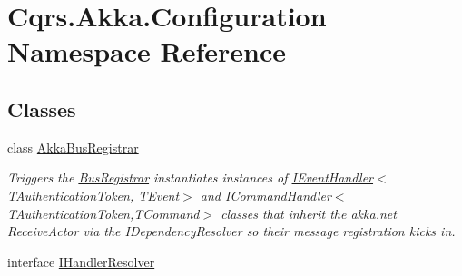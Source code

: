 \hypertarget{namespaceCqrs_1_1Akka_1_1Configuration}{}\section{Cqrs.\+Akka.\+Configuration Namespace Reference}
\label{namespaceCqrs_1_1Akka_1_1Configuration}
\subsection*{Classes}
\begin{DoxyCompactItemize}
\item 
class \hyperlink{classCqrs_1_1Akka_1_1Configuration_1_1AkkaBusRegistrar}{Akka\+Bus\+Registrar}
\begin{DoxyCompactList}\small\item\em Triggers the \hyperlink{classCqrs_1_1Configuration_1_1BusRegistrar_a4a934d21a535b28af6c67154512bba20_a4a934d21a535b28af6c67154512bba20}{Bus\+Registrar} instantiates instances of \hyperlink{interfaceCqrs_1_1Events_1_1IEventHandler}{I\+Event\+Handler$<$\+T\+Authentication\+Token, T\+Event$>$} and I\+Command\+Handler$<$\+T\+Authentication\+Token,\+T\+Command$>$ classes that inherit the akka.\+net Receive\+Actor via the I\+Dependency\+Resolver so their message registration kicks in. \end{DoxyCompactList}\item 
interface \hyperlink{interfaceCqrs_1_1Akka_1_1Configuration_1_1IHandlerResolver}{I\+Handler\+Resolver}
\end{DoxyCompactItemize}
